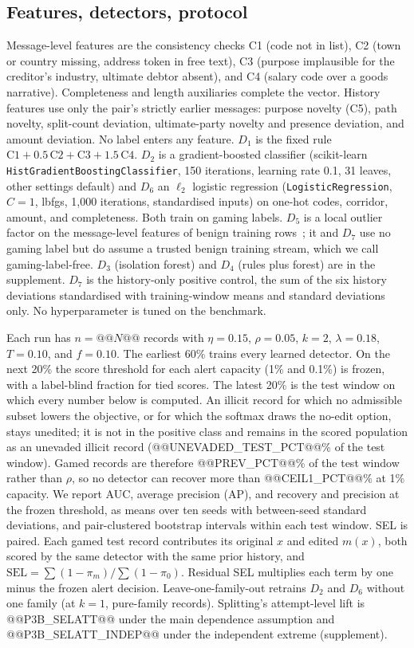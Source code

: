 \documentclass[conference]{IEEEtran}
\begin{document}
\subsection{Features, detectors, protocol}
Message-level features are the consistency checks C1 (code not in list), C2
(town or country missing, address token in free text), C3 (purpose
implausible for the creditor's industry, ultimate debtor absent), and C4
(salary code over a goods narrative). Completeness and length auxiliaries
complete the vector.
History features use only the pair's strictly earlier messages: purpose
novelty (C5), path novelty, split-count deviation, ultimate-party novelty and
presence deviation, and amount deviation. No label enters any feature. $D_1$
is the fixed rule $\mathrm{C1}+0.5\,\mathrm{C2}+\mathrm{C3}+1.5\,\mathrm{C4}$.
$D_2$ is a gradient-boosted classifier (scikit-learn
\texttt{HistGradientBoostingClassifier}, 150 iterations, learning rate 0.1,
31 leaves, other settings default) and $D_6$ an $\ell_2$ logistic regression
(\texttt{LogisticRegression}, $C=1$, lbfgs, 1,000 iterations, standardised
inputs) on one-hot codes, corridor, amount, and completeness. Both train on
gaming labels. $D_5$ is a local outlier factor on the message-level features of
benign training rows~\cite{breunig2000}; it and $D_7$ use no gaming label but
do assume a trusted benign training stream, which we call gaming-label-free. $D_3$ (isolation forest) and $D_4$
(rules plus forest) are in the supplement. $D_7$ is the history-only positive
control, the sum of the six history deviations standardised with
training-window means and standard deviations only. No
hyperparameter is tuned on the benchmark.

Each run has $n=@@N@@$ records with $\eta=0.15$, $\rho=0.05$, $k=2$,
$\lambda=0.18$, $T=0.10$, and $f=0.10$. The earliest 60\% trains every
learned detector. On the next 20\% the score threshold for each alert capacity (1\%
and 0.1\%) is frozen, with a label-blind fraction for tied scores. The latest
20\% is the test window on which every number below is computed. An illicit record for which no admissible subset lowers the objective, or
for which the softmax draws the no-edit option, stays unedited; it is not in
the positive class and remains in the scored population as an unevaded
illicit record (@@UNEVADED_TEST_PCT@@\% of the test window). Gamed records
are therefore @@PREV_PCT@@\% of the test window rather than $\rho$, so no
detector can recover more than @@CEIL1_PCT@@\% at 1\% capacity. We report AUC, average precision
(AP), and recovery and precision at the frozen threshold, as means over ten
seeds with between-seed standard deviations, and pair-clustered bootstrap
intervals within each test window. SEL is paired. Each gamed test record
contributes its original $x$ and edited $m(x)$, both scored by the same
detector with the same prior history, and
$\mathrm{SEL}=\sum(1-\pi_m)/\sum(1-\pi_0)$. Residual SEL multiplies each
term by one minus the frozen alert decision. Leave-one-family-out retrains
$D_2$ and $D_6$ without one family (at $k=1$, pure-family records).
Splitting's attempt-level lift is @@P3B_SELATT@@ under the main dependence
assumption and @@P3B_SELATT_INDEP@@ under the independent extreme
(supplement).
\end{document}
